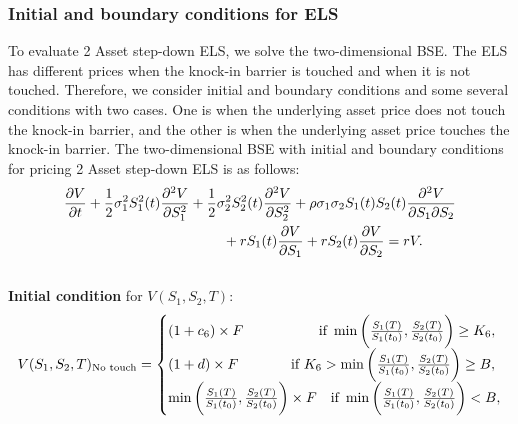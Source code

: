 \documentclass[11pt,reqno]{article}
\numberwithin{equation}{section}
\begin{document}
{\subsubsection{Initial and boundary conditions for ELS}
To evaluate 2 Asset step-down ELS, we solve the two-dimensional BSE. The ELS has different prices when the knock-in barrier is touched and when it is not touched. Therefore, we consider initial and boundary conditions and some several conditions with two cases. One is when the underlying asset price does not touch the knock-in barrier, and the other is when the underlying asset price touches the knock-in barrier. The two-dimensional BSE with initial and boundary conditions for pricing 2 Asset step-down ELS is as follows:
\begin{equation}\label{eqn:2D-BSE}
\begin{aligned}
    &\frac{\partial V}{\partial t}
        + \frac{1}{2} \sigma_1^2 S_1^2(t) \frac{\partial^2 V}{\partial S_1^2}
        + \frac{1}{2} \sigma_2^2 S_2^2(t) \frac{\partial^2 V}{\partial S_2^2} 
       + \rho \sigma_1 \sigma_2 S_1(t) S_2(t) \frac{\partial^2 V}{\partial S_1 \partial S_2} \\
   &\hspace{40mm} + rS_1(t)\frac{\partial V}{\partial S_1} 
        + rS_2(t)\frac{\partial V}{\partial S_2}
        = rV.
\end{aligned}
\end{equation} 
\\
\textbf{Initial condition} for $V(S_1,S_2,T)$:
\begin{equation*}
\begin{aligned}
    V(S_1,S_2,T)_{\text{No touch}} = 
    \begin{cases}
    (1 + c_6) \times F
    & \hspace{-3mm} \mbox{if } 
    \min \bigg(\frac{S_1(T)}{S_1(t_0)}, \frac{S_2(T)}{S_2(t_0)}\bigg) 
    \ge K_6,  \\
    (1 + d) \times F 
    &\hspace{-10mm} \mbox{if }  
    K_6 > 
    \min \bigg(\frac{S_1(T)}{S_1(t_0)}, \frac{S_2(T)}{S_2(t_0)}\bigg) 
    \ge B, \\
    \min \bigg(\frac{S_1(T)}{S_1(t_0)}, \frac{S_2(T)}{S_2(t_0)}\bigg) \times F
    & \mbox{if }  
    \min \bigg(\frac{S_1(T)}{S_1(t_0)}, \frac{S_2(T)}{S_2(t_0)}\bigg) 
    < B,
    \end{cases}
\end{aligned}
\end{equation*}
\begin{equation*}

\end{equation*}}
\end{document}
